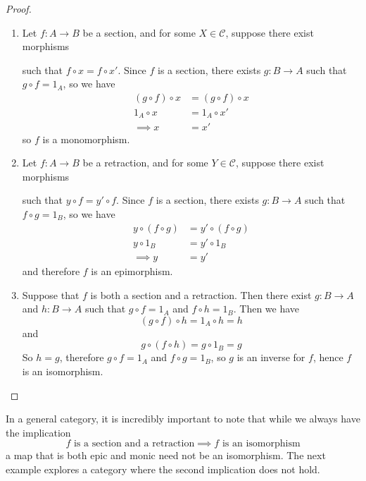 \documentclass[10pt,oneside]{book}
\def\~#1{\mathscr{#1}}
\theoremstyle{plain}
\theoremstyle{definition}
\theoremstyle{remark}
\numberwithin{equation}{section}
\numberwithin{figure}{section}
\begin{document}
\begin{proof}
    \hfill
    \begin{enumerate}[label=(\roman*)]
        \item Let $f: A \to B$ be a section, and for some $X \in \~C$, suppose there exist morphisms  such that $f \circ x = f \circ x'$. Since $f$ is a section, there exists $g: B \to A$ such that $g \circ f = 1_A$, so we have
            \begin{align*}
                (g \circ f) \circ x &= (g \circ f) \circ x \\
                1_A \circ x&= 1_A \circ x' \\
                \implies x &= x'
            \end{align*}
        so $f$ is a monomorphism.
        
        \item Let $f: A \to B$ be a retraction, and for some $Y \in \~C$, suppose there exist morphisms  such that $y \circ f = y' \circ f$. Since $f$ is a section, there exists $g: B \to A$ such that $f \circ g = 1_B$, so we have
            \begin{align*}
                y \circ (f \circ g) &= y' \circ (f \circ g) \\
                y \circ 1_B &= y' \circ 1_B \\
                \implies y &= y'
            \end{align*}
        and therefore $f$ is an epimorphism.

        \item Suppose that $f$ is both a section and a retraction. Then there exist $g: B \to A$ and $h: B \to A$ such that $g \circ f = 1_A$ and $f \circ h = 1_B$. Then we have
        \[(g \circ f) \circ h = 1_A \circ h = h\]
        and 
        \[g \circ (f \circ h) = g \circ 1_B = g\]
        So $h = g$, therefore $g \circ f = 1_A$ and $f \circ g = 1_B$, so $g$ is an inverse for $f$, hence $f$ is an isomorphism.
    \end{enumerate}
\end{proof}

In a general category, it is incredibly important to note that while we always have the implication
\[f \text{ is a section and a retraction} \implies f \text{ is an isomorphism}\]
a map that is both epic and monic need not be an isomorphism. The next example explores a category where the second implication does not hold.
\end{document}
